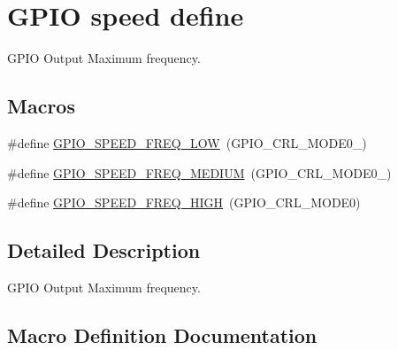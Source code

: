 \hypertarget{group___g_p_i_o__speed__define}{}\section{G\+P\+IO speed define}
\label{group___g_p_i_o__speed__define}


G\+P\+IO Output Maximum frequency.  


\subsection*{Macros}
\begin{DoxyCompactItemize}
\item 
\#define \hyperlink{group___g_p_i_o__speed__define_gab7916c4265bfa1b26a5205ea9c1caa4e}{G\+P\+I\+O\+\_\+\+S\+P\+E\+E\+D\+\_\+\+F\+R\+E\+Q\+\_\+\+L\+OW}~(G\+P\+I\+O\+\_\+\+C\+R\+L\+\_\+\+M\+O\+D\+E0\+\_)
\item 
\#define \hyperlink{group___g_p_i_o__speed__define_ga1724a25a9cf00ebf485daeb09cfa1e25}{G\+P\+I\+O\+\_\+\+S\+P\+E\+E\+D\+\_\+\+F\+R\+E\+Q\+\_\+\+M\+E\+D\+I\+UM}~(G\+P\+I\+O\+\_\+\+C\+R\+L\+\_\+\+M\+O\+D\+E0\+\_)
\item 
\#define \hyperlink{group___g_p_i_o__speed__define_gaef5898db71cdb957cd41f940b0087af8}{G\+P\+I\+O\+\_\+\+S\+P\+E\+E\+D\+\_\+\+F\+R\+E\+Q\+\_\+\+H\+I\+GH}~(G\+P\+I\+O\+\_\+\+C\+R\+L\+\_\+\+M\+O\+D\+E0)
\end{DoxyCompactItemize}


\subsection{Detailed Description}
G\+P\+IO Output Maximum frequency. 



\subsection{Macro Definition Documentation}
\mbox{\label{group___g_p_i_o__speed__define_gaef5898db71cdb957cd41f940b0087af8}} 
